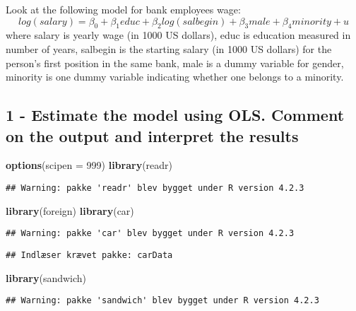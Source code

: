 \documentclass[
]{article}
\newenvironment{Shaded}{\begin{snugshade}}{\end{snugshade}}
\newcommand{\AttributeTok}[1]{\textcolor[rgb]{0.13,0.29,0.53}{#1}}
\newcommand{\DecValTok}[1]{\textcolor[rgb]{0.00,0.00,0.81}{#1}}
\newcommand{\FunctionTok}[1]{\textcolor[rgb]{0.13,0.29,0.53}{\textbf{#1}}}
\newcommand{\NormalTok}[1]{#1}
\begin{document}
Look at the following model for bank employees wage:
\[log(salary)=\beta_0+\beta_1educ+\beta_2log(salbegin)+\beta_3male+\beta_4 minority+u\]
where salary is yearly wage (in 1000 US dollars), educ is education
measured in number of years, salbegin is the starting salary (in 1000 US
dollars) for the person's first position in the same bank, male is a
dummy variable for gender, minority is one dummy variable indicating
whether one belongs to a minority.

\subsection{1 - Estimate the model using OLS. Comment on the output and
interpret the
results}\label{estimate-the-model-using-ols.-comment-on-the-output-and-interpret-the-results}

\begin{Shaded}
\begin{Highlighting}[]
\FunctionTok{options}\NormalTok{(}\AttributeTok{scipen =} \DecValTok{999}\NormalTok{)}
\FunctionTok{library}\NormalTok{(readr)}
\end{Highlighting}
\end{Shaded}

\begin{verbatim}
## Warning: pakke 'readr' blev bygget under R version 4.2.3
\end{verbatim}

\begin{Shaded}
\begin{Highlighting}[]
\FunctionTok{library}\NormalTok{(foreign)}
\FunctionTok{library}\NormalTok{(car)}
\end{Highlighting}
\end{Shaded}

\begin{verbatim}
## Warning: pakke 'car' blev bygget under R version 4.2.3
\end{verbatim}

\begin{verbatim}
## Indlæser krævet pakke: carData
\end{verbatim}

\begin{Shaded}
\begin{Highlighting}[]
\FunctionTok{library}\NormalTok{(sandwich)}
\end{Highlighting}
\end{Shaded}

\begin{verbatim}
## Warning: pakke 'sandwich' blev bygget under R version 4.2.3
\end{verbatim}
\end{document}
